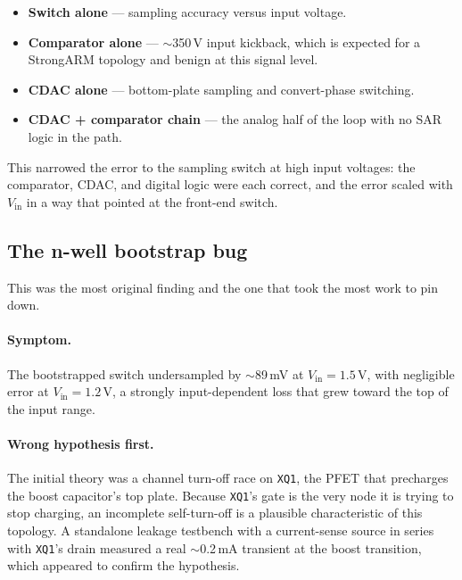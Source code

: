 \documentclass[12pt, a4paper]{article}
\begin{document}
\begin{itemize}
  \item \textbf{Switch alone} --- sampling accuracy versus input voltage.
  \item \textbf{Comparator alone} --- $\sim$350\,\textmu V input kickback,
        which is expected for a StrongARM topology and benign at this
        signal level.
  \item \textbf{CDAC alone} --- bottom-plate sampling and convert-phase
        switching.
  \item \textbf{CDAC + comparator chain} --- the analog half of the loop
        with no SAR logic in the path.
\end{itemize}

This narrowed the error to the sampling switch at high input voltages: the
comparator, CDAC, and digital logic were each correct, and the error scaled
with $V_\mathrm{in}$ in a way that pointed at the front-end switch.

\subsection{The n-well bootstrap bug}
\label{subsection:nwell}

This was the most original finding and the one that took the most work to
pin down.

\paragraph{Symptom.} The bootstrapped switch undersampled by
$\sim$89\,mV at $V_\mathrm{in}=1.5$\,V, with negligible error at
$V_\mathrm{in}=1.2$\,V, a strongly input-dependent loss that grew toward
the top of the input range.

\paragraph{Wrong hypothesis first.} The initial theory was a channel
turn-off race on \texttt{XQ1}, the PFET that precharges the boost
capacitor's top plate. Because \texttt{XQ1}'s gate is the very node it is
trying to stop charging, an incomplete self-turn-off is a plausible
characteristic of this topology. A standalone leakage testbench with a
current-sense source in series with \texttt{XQ1}'s drain measured a real
$\sim$0.2\,mA transient at the boost transition, which appeared to confirm
the hypothesis.
\end{document}
